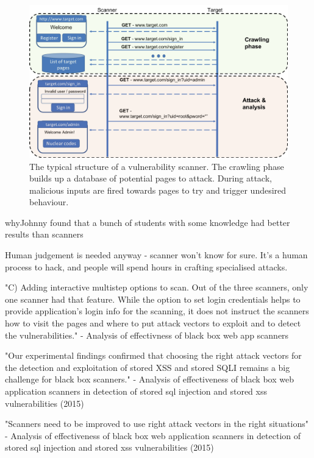 \begin{figure}[h]
	\centering
	\includegraphics[width=\textwidth]{images/scanner_structure.png}
	\caption{The typical structure of a vulnerability scanner. The crawling phase builds up a database of potential pages to attack. During attack, malicious inputs are fired towards pages to try and trigger undesired behaviour.}
	\label{fig:test}
\end{figure}



 
whyJohnny found that a bunch of students with some knowledge had better results than scanners




 
 Human judgement is needed anyway - scanner won't know for sure. It's a human process to hack, and people will spend hours in crafting specialised attacks. 
 
 
 
 "C) Adding interactive multistep options to scan. Out of the three scanners, only one scanner had that feature. While the option to set login credentials helps to provide application’s login info for the scanning, it does not instruct the scanners how to visit the pages and where to put attack vectors to exploit and to detect the vulnerabilities." - Analysis of effectivness of black box web app scanners 
 
 
 "Our experimental findings confirmed that choosing the right attack vectors for the detection and exploitation of stored XSS and stored SQLI remains a big challenge for black box scanners." - Analysis of effectiveness of black box web application scanners in detection of stored sql injection and stored xss vulnerabilities (2015)
 
 "Scanners need to be improved to use right attack vectors in the right situations" - Analysis of effectiveness of black box web application scanners in detection of stored sql injection and stored xss vulnerabilities (2015)
 
